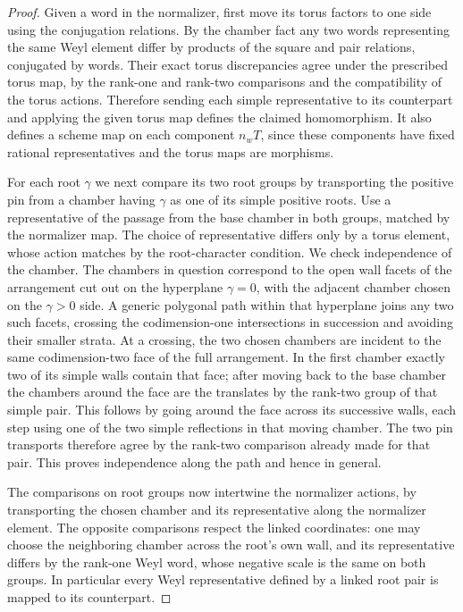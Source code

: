 \documentclass[11pt,a4paper,openany,oneside]{book}
\theoremstyle{resultstyle}
\theoremstyle{definition}
\numberwithin{equation}{chapter}
\begin{document}
\begin{proof}
Given a word in the normalizer, first move its torus
factors to one side using the conjugation relations.
By the chamber fact any two words representing the same
Weyl element differ by products of the square and pair
relations, conjugated by words. Their exact torus
discrepancies agree under the prescribed torus map, by
the rank-one and rank-two comparisons and the compatibility
of the torus actions. Therefore sending each simple
representative to its counterpart and applying the given
torus map defines the claimed homomorphism. It also
defines a scheme map on each component \(n_wT\),
since these components have fixed rational representatives
and the torus maps are morphisms.

For each root \(\gamma\) we next compare its two root
groups by transporting the positive pin from a chamber
having \(\gamma\) as one of its simple positive roots.
Use a representative of the passage from the base
chamber in both groups, matched by the normalizer map.
The choice of representative differs only by a torus
element, whose action matches by the root-character
condition. We check independence of the chamber.
The chambers in question correspond to the open wall
facets of the arrangement cut out on the hyperplane
\(\gamma=0\), with the adjacent chamber chosen on the
\(\gamma>0\) side. A generic polygonal path within that
hyperplane joins any two such facets, crossing the
codimension-one intersections in succession and avoiding
their smaller strata. At a crossing, the two chosen
chambers are incident to the same codimension-two face
of the full arrangement. In the first chamber exactly
two of its simple walls contain that face; after moving
back to the base chamber the chambers around the face
are the translates by the rank-two group of that
simple pair. This follows by going around the face across
its successive walls, each step using one of the two
simple reflections in that moving chamber. The two
pin transports therefore agree by the rank-two comparison
already made for that pair. This proves independence
along the path and hence in general.

The comparisons on root groups now intertwine the
normalizer actions, by transporting the chosen chamber
and its representative along the normalizer element.
The opposite comparisons respect the linked coordinates:
one may choose the neighboring chamber across the
root's own wall, and its representative differs by the
rank-one Weyl word, whose negative scale is the same
on both groups. In particular every Weyl representative
defined by a linked root pair is mapped to its counterpart.


\end{proof}
\end{document}
